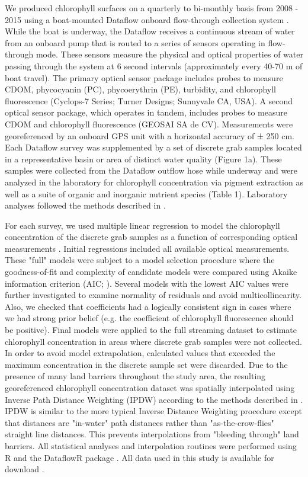 We produced chlorophyll surfaces on a quarterly to bi-monthly basis from 2008 - 2015 using a boat-mounted Dataflow onboard flow-through collection system \citep{madden1992instrument}. While the boat is underway, the Dataflow receives a continuous stream of water from an onboard pump that is routed to a series of sensors operating in flow-through mode. These sensors measure the physical and optical properties of water passing through the system at 6 second intervals (approximately every 40-70 m of boat travel). The primary optical sensor package includes probes to measure CDOM, phycocyanin (PC), phycoerythrin (PE), turbidity, and chlorophyll fluorescence (Cyclops-7 Series; Turner Designs; Sunnyvale CA, USA). A second optical sensor package, which operates in tandem, includes probes to measure CDOM and chlorophyll fluorescence (GEOSAI SA de CV). Measurements were georeferenced by an onboard GPS unit with a horizontal accuracy of ± 250 cm. Each Dataflow survey was supplemented by a set of discrete grab samples located in a representative basin or area of distinct water quality (Figure 1a). These samples were collected from the Dataflow outflow hose while underway and were analyzed in the laboratory for chlorophyll concentration via pigment extraction as well as a suite of organic and inorganic nutrient species (Table 1). Laboratory analyses followed the methods described in \citep{childers_relating_2006}. 

For each survey, we used multiple linear regression to model the chlorophyll concentration of the discrete grab samples as a function of corresponding optical measurements \citep{seppala_ship_opportunity_2007,seppala_multivariate_2008}. Initial regressions included all available optical measurements. These "full" models were subject to a model selection procedure where the goodness-of-fit and complexity of candidate models were compared using Akaike information criterion (AIC; \citep{venables2002modern}). Several models with the lowest AIC values were further investigated to examine normality of residuals and avoid multicollinearity. Also, we checked that coefficients had a logically consistent sign in cases where we had strong prior belief (e.g. the coefficient of chlorophyll fluorescence should be positive). Final models were applied to the full streaming dataset to estimate chlorophyll concentration in areas where discrete grab samples were not collected. In order to avoid model extrapolation, calculated values that exceeded the maximum concentration in the discrete sample set were discarded. Due to the presence of many land barriers throughout the study area, the resulting georeferenced chlorophyll concentration dataset was spatially interpolated using Inverse Path Distance Weighting (IPDW) according to the methods described in \citep{stachelek_application_2015}. IPDW is similar to the more typical Inverse Distance Weighting procedure except that distances are "in-water" path distances rather than "as-the-crow-flies" straight line distances. This prevents interpolations from "bleeding through" land barriers. All statistical analyses and interpolation routines were performed using R \citep{rcore_2015} and the DataflowR package \citep{dataflowr}. All data used in this study is available for download \citep{madden2017}. 


